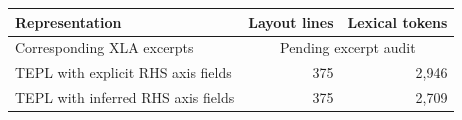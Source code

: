 \begin{tabular}{lrr}
\toprule
Representation & Layout lines & Lexical tokens \\
\midrule
Corresponding XLA excerpts & \multicolumn{2}{c}{Pending excerpt audit} \\
TEPL with explicit RHS axis fields & 375 & 2,946 \\
TEPL with inferred RHS axis fields & 375 & 2,709 \\
\bottomrule
\end{tabular}
